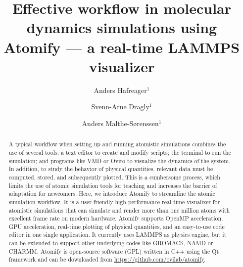 \documentclass[12pt,a4paper,final]{iopart}
\begin{document}
\title{Effective workflow in molecular dynamics simulations using Atomify --- a real-time LAMMPS visualizer}

\author[cor1]{Anders Hafreager$^{1}$}

\author{Svenn-Arne Dragly$^{1}$}

\author{Anders Malthe-S\o renssen$^{1}$}
\address{$^1$Department of Physics - University of Oslo\\Sem S{\ae}lands vei 24, NO-0316, Oslo, Norway}

\begin{abstract}
A typical workflow when setting up and running atomistic simulations combines the use of several tools:
a text editor to create and modify scripts; the terminal to run the simulation; and programs like VMD or Ovito to visualize the dynamics of the system. In addition, to study the behavior of physical quantities, relevant data must be computed, stored, and subsequently plotted. This is a cumbersome process, which limits the use of atomic simulation tools for teaching and increases the barrier of adaptation for newcomers. 
Here, we introduce Atomify to streamline the atomic simulation workflow. It is a user-friendly high-performance real-time visualizer for atomistic simulations that can simulate and render more than one million atoms with excellent frame rate on modern hardware.
Atomify supports OpenMP acceleration, GPU acceleration, real-time plotting of physical quantities, and an easy-to-use code editor in one single application.
It currently uses LAMMPS as physics engine, but it can be extended to support other underlying codes like GROMACS, NAMD or CHARMM.
Atomify is open-source software (GPL) written in C++ using the Qt framework and can be downloaded from \url{https://github.com/ovilab/atomify}.
\end{abstract}

\vspace{2pc}
\end{document}
